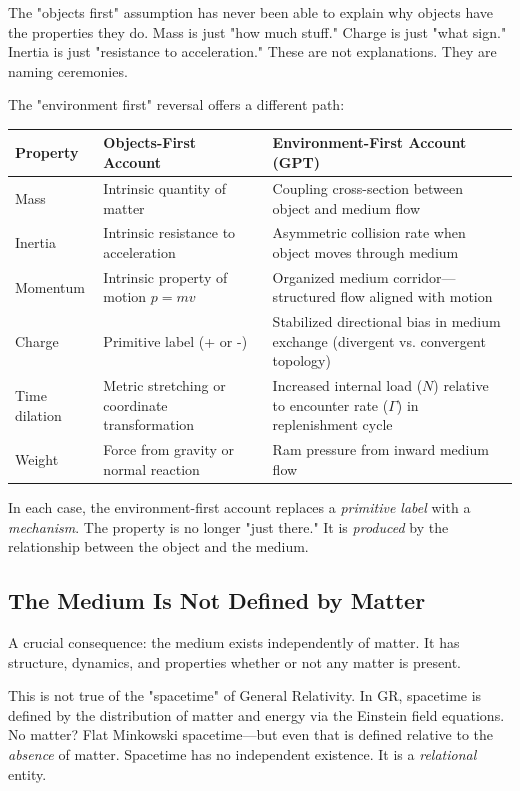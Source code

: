 \documentclass[12pt, a4paper]{article}
\begin{document}
The "objects first" assumption has never been able to explain why objects have the properties they do. Mass is just "how much stuff." Charge is just "what sign." Inertia is just "resistance to acceleration." These are not explanations. They are naming ceremonies.

The "environment first" reversal offers a different path:

\begin{center}
\begin{tabular}{|p{2.5cm}|p{5cm}|p{5cm}|}
\hline
\textbf{Property} & \textbf{Objects-First Account} & \textbf{Environment-First Account (GPT)} \\
\hline
Mass & Intrinsic quantity of matter & Coupling cross-section between object and medium flow \\
\hline
Inertia & Intrinsic resistance to acceleration & Asymmetric collision rate when object moves through medium \\
\hline
Momentum & Intrinsic property of motion \( p = mv \) & Organized medium corridor—structured flow aligned with motion \\
\hline
Charge & Primitive label (+ or -) & Stabilized directional bias in medium exchange (divergent vs. convergent topology) \\
\hline
Time dilation & Metric stretching or coordinate transformation & Increased internal load (\(N\)) relative to encounter rate (\(\Gamma\)) in replenishment cycle \\
\hline
Weight & Force from gravity or normal reaction & Ram pressure from inward medium flow \\
\hline
\end{tabular}
\end{center}

In each case, the environment-first account replaces a \textit{primitive label} with a \textit{mechanism}. The property is no longer "just there." It is \textit{produced} by the relationship between the object and the medium.

\subsection{The Medium Is Not Defined by Matter}
\label{subsec:medium_independent}

A crucial consequence: the medium exists independently of matter. It has structure, dynamics, and properties whether or not any matter is present.

This is not true of the "spacetime" of General Relativity. In GR, spacetime is defined by the distribution of matter and energy via the Einstein field equations. No matter? Flat Minkowski spacetime—but even that is defined relative to the \textit{absence} of matter. Spacetime has no independent existence. It is a \textit{relational} entity.
\end{document}
